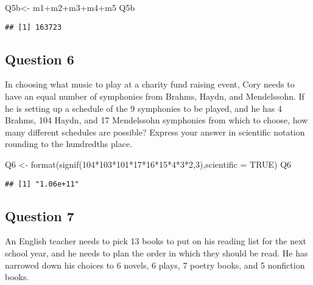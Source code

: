 \documentclass[
]{article}
\newenvironment{Shaded}{\begin{snugshade}}{\end{snugshade}}
\newcommand{\AttributeTok}[1]{\textcolor[rgb]{0.77,0.63,0.00}{#1}}
\newcommand{\ConstantTok}[1]{\textcolor[rgb]{0.00,0.00,0.00}{#1}}
\newcommand{\DecValTok}[1]{\textcolor[rgb]{0.00,0.00,0.81}{#1}}
\newcommand{\FunctionTok}[1]{\textcolor[rgb]{0.00,0.00,0.00}{#1}}
\newcommand{\NormalTok}[1]{#1}
\newcommand{\OtherTok}[1]{\textcolor[rgb]{0.56,0.35,0.01}{#1}}
\newcommand{\SpecialCharTok}[1]{\textcolor[rgb]{0.00,0.00,0.00}{#1}}
\begin{document}
\begin{Shaded}
\begin{Highlighting}[]
\NormalTok{Q5b}\OtherTok{\textless{}{-}}\NormalTok{ m1}\SpecialCharTok{+}\NormalTok{m2}\SpecialCharTok{+}\NormalTok{m3}\SpecialCharTok{+}\NormalTok{m4}\SpecialCharTok{+}\NormalTok{m5}
\NormalTok{Q5b}
\end{Highlighting}
\end{Shaded}

\begin{verbatim}
## [1] 163723
\end{verbatim}

\hypertarget{question-6}{%
\subsection{Question 6}\label{question-6}}

In choosing what music to play at a charity fund raising event, Cory
needs to have an equal number of symphonies from Brahms, Haydn, and
Mendelssohn. If he is setting up a schedule of the 9 symphonies to be
played, and he has 4 Brahms, 104 Haydn, and 17 Mendelssohn symphonies
from which to choose, how many different schedules are possible? Express
your answer in scientific notation rounding to the hundredths place.

\begin{Shaded}
\begin{Highlighting}[]
\NormalTok{Q6 }\OtherTok{\textless{}{-}} \FunctionTok{format}\NormalTok{(}\FunctionTok{signif}\NormalTok{(}\DecValTok{104}\SpecialCharTok{*}\DecValTok{103}\SpecialCharTok{*}\DecValTok{101}\SpecialCharTok{*}\DecValTok{17}\SpecialCharTok{*}\DecValTok{16}\SpecialCharTok{*}\DecValTok{15}\SpecialCharTok{*}\DecValTok{4}\SpecialCharTok{*}\DecValTok{3}\SpecialCharTok{*}\DecValTok{2}\NormalTok{,}\DecValTok{3}\NormalTok{),}\AttributeTok{scientific =} \ConstantTok{TRUE}\NormalTok{)}
\NormalTok{Q6}
\end{Highlighting}
\end{Shaded}

\begin{verbatim}
## [1] "1.06e+11"
\end{verbatim}

\hypertarget{question-7}{%
\subsection{Question 7}\label{question-7}}

An English teacher needs to pick 13 books to put on his reading list for
the next school year, and he needs to plan the order in which they
should be read. He has narrowed down his choices to 6 novels, 6 plays, 7
poetry books, and 5 nonfiction books.
\end{document}
